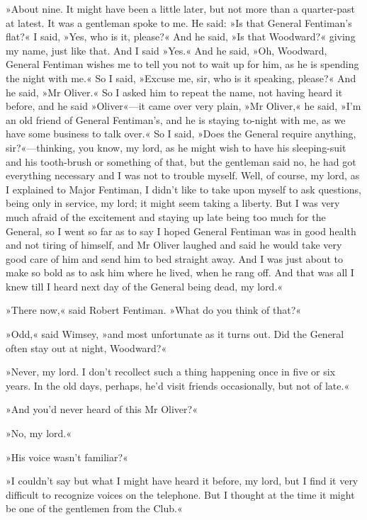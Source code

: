 »About nine. It might have been a little later, but not more than a quarter-past at latest. It was a gentleman spoke to me. He said: »Is that General Fentiman's flat?« I said, »Yes, who is it, please?« And he said, »Is that Woodward?« giving my name, just like that. And I said »Yes.« And he said, »Oh, Woodward, General Fentiman wishes me to tell you not to wait up for him, as he is spending the night with me.« So I said, »Excuse me, sir, who is it speaking, please?« And he said, »Mr Oliver.« So I asked him to repeat the name, not having heard it before, and he said »Oliver«—it came over very plain, »Mr Oliver,« he said, »I'm an old friend of General Fentiman's, and he is staying to-night with me, as we have some business to talk over.« So I said, »Does the General require anything, sir?«—thinking, you know, my lord, as he might wish to have his sleeping-suit and his tooth-brush or something of that, but the gentleman said no, he had got everything necessary and I was not to trouble myself. Well, of course, my lord, as I explained to Major Fentiman, I didn't like to take upon myself to ask questions, being only in service, my lord; it might seem taking a liberty. But I was very much afraid of the excitement and staying up late being too much for the General, so I went so far as to say I hoped General Fentiman was in good health and not tiring of himself, and Mr Oliver laughed and said he would take very good care of him and send him to bed straight away. And I was just about to make so bold as to ask him where he lived, when he rang off. And that was all I knew till I heard next day of the General being dead, my lord.«

»There now,« said Robert Fentiman. »What do you think of that?«

»Odd,« said Wimsey, »and most unfortunate as it turns out. Did the General often stay out at night, Woodward?«

»Never, my lord. I don't recollect such a thing happening once in five or six years. In the old days, perhaps, he'd visit friends occasionally, but not of late.«

»And you'd never heard of this Mr Oliver?«

»No, my lord.«

»His voice wasn't familiar?«

»I couldn't say but what I might have heard it before, my lord, but I find it very difficult to recognize voices on the telephone. But I thought at the time it might be one of the gentlemen from the Club.«

